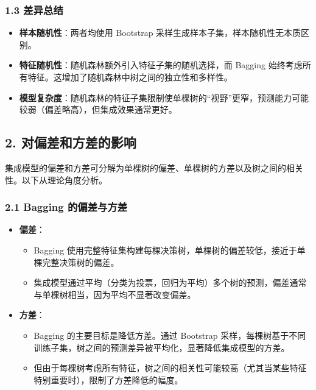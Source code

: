 \documentclass{article}
\begin{document}
\subsubsection*{1.3 差异总结}
\begin{itemize}
    \item \textbf{样本随机性}：两者均使用 Bootstrap 采样生成样本子集，样本随机性无本质区别。
    \item \textbf{特征随机性}：随机森林额外引入特征子集的随机选择，而 Bagging 始终考虑所有特征。这增加了随机森林中树之间的独立性和多样性。
    \item \textbf{模型复杂度}：随机森林的特征子集限制使单棵树的“视野”更窄，预测能力可能较弱（偏差略高），但集成效果通常更好。
\end{itemize}

\subsection*{2. 对偏差和方差的影响}

集成模型的偏差和方差可分解为单棵树的偏差、单棵树的方差以及树之间的相关性。以下从理论角度分析。

\subsubsection*{2.1 Bagging 的偏差与方差}
\begin{itemize}
    \item \textbf{偏差}：
    \begin{itemize}
        \item Bagging 使用完整特征集构建每棵决策树，单棵树的偏差较低，接近于单棵完整决策树的偏差。
        \item 集成模型通过平均（分类为投票，回归为平均）多个树的预测，偏差通常与单棵树相当，因为平均不显著改变偏差。
    \end{itemize}
    \item \textbf{方差}：
    \begin{itemize}
        \item Bagging 的主要目标是降低方差。通过 Bootstrap 采样，每棵树基于不同训练子集，树之间的预测差异被平均化，显著降低集成模型的方差。
        \item 但由于每棵树考虑所有特征，树之间的相关性可能较高（尤其当某些特征特别重要时），限制了方差降低的幅度。
    \end{itemize}
\end{itemize}
\end{document}
